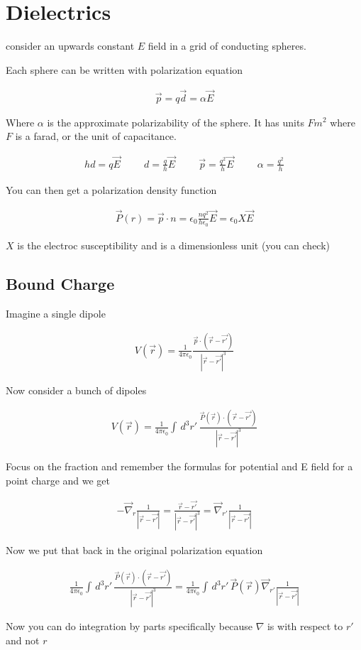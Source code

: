 \documentclass[fleqn]{report}
\newcommand{\hp}{\hspace{1cm}}
\newcommand{\equations} [1] {
\begin{gather*}
#1
\end{gather*}
}
\begin{document}
\chapter{Dielectrics}
consider an upwards constant $E$ field in a grid of conducting spheres. 

Each sphere can be written with polarization equation
\equations{
    \vec p = q \vec d = \alpha \vec E
}
Where $\alpha$ is the approximate polarizability of the sphere. 
It has units $Fm^2$ where $F$ is a farad, or the unit of capacitance. 

\equations{
    hd = q \vec E 
    \hp 
    d = \frac{q}{h} \vec E
    \hp
    \vec p = \frac{q^2}{h} \vec E 
    \hp
    \alpha = \frac{q^2}{h}
}

You can then get a polarization density function 
\equations{
    \vec P(r) = \vec p \cdot n
    =
    \epsilon_0 \frac{n q^2}{h \epsilon_0}\vec E
    =
    \epsilon_0 X \vec E 
}

$X$ is the electroc susceptibility and is a dimensionless unit (you can check)

\section{Bound Charge}
Imagine a single dipole 

\equations{
    V(\vec r) 
    =
    \frac{1}{4 \pi \epsilon_0}
    \frac{\vec p \cdot (\vec r - \vec{r'})}{|\vec r - \vec{r'}|^3}
}

Now consider a bunch of dipoles 
\equations{
    V(\vec r)
    =
    \frac{1}{4 \pi \epsilon_0}
    \int \, d^3 r' \, 
    \frac{\vec P(\vec r) \cdot (\vec r - \vec{r'})}{|\vec r - \vec{r'}|^3}
}

Focus on the fraction and remember the formulas for potential and 
E field for a point charge and we get 

\equations{
    -\vec \nabla_r \frac{1}{|\vec r - \vec{r'}|}
    =
    \frac{\vec r - \vec{r'}}{|\vec r - \vec{r'}|^3}
    =
    \vec \nabla_{r'} 
    \frac{1}{|\vec r - \vec{r'}|}
}

Now we put that back in the original polarization equation 
\equations{
    \frac{1}{4 \pi \epsilon_0}
    \int \, d^3 r' \, 
    \frac{\vec P(\vec r) \cdot (\vec r - \vec{r'})}{|\vec r - \vec{r'}|^3}
    =
    \frac{1}{4 \pi \epsilon_0}
    \int \, d^3 r' \, 
    \vec P(\vec r)
    \vec \nabla_{r'}
    \frac{1}{|\vec r - \vec{r'}|}
}

Now you can do integration by parts specifically because $\nabla$ is 
with respect to $r'$ and not $r$
\end{document}
